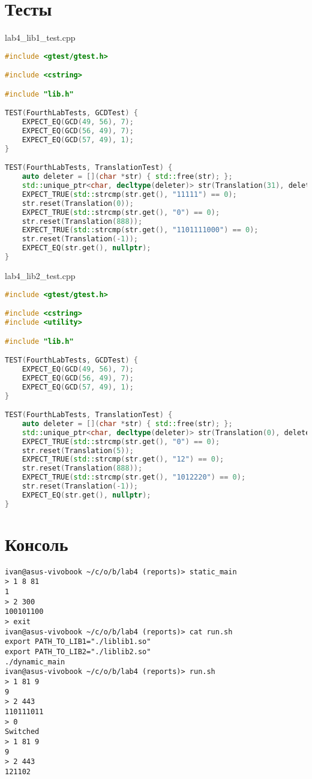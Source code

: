 \documentclass[a4paper, 12pt]{article}
\begin{document}
\newpage
\section{Тесты}
lab4\_lib1\_test.cpp
\begin{lstlisting}[language=C++]
#include <gtest/gtest.h>

#include <cstring>

#include "lib.h"

TEST(FourthLabTests, GCDTest) {
    EXPECT_EQ(GCD(49, 56), 7);
    EXPECT_EQ(GCD(56, 49), 7);
    EXPECT_EQ(GCD(57, 49), 1);
}

TEST(FourthLabTests, TranslationTest) {
    auto deleter = [](char *str) { std::free(str); };
    std::unique_ptr<char, decltype(deleter)> str(Translation(31), deleter);
    EXPECT_TRUE(std::strcmp(str.get(), "11111") == 0);
    str.reset(Translation(0));
    EXPECT_TRUE(std::strcmp(str.get(), "0") == 0);
    str.reset(Translation(888));
    EXPECT_TRUE(std::strcmp(str.get(), "1101111000") == 0);
    str.reset(Translation(-1));
    EXPECT_EQ(str.get(), nullptr);
}
\end{lstlisting}
lab4\_lib2\_test.cpp
\begin{lstlisting}[language=C++]
#include <gtest/gtest.h>

#include <cstring>
#include <utility>

#include "lib.h"

TEST(FourthLabTests, GCDTest) {
    EXPECT_EQ(GCD(49, 56), 7);
    EXPECT_EQ(GCD(56, 49), 7);
    EXPECT_EQ(GCD(57, 49), 1);
}

TEST(FourthLabTests, TranslationTest) {
    auto deleter = [](char *str) { std::free(str); };
    std::unique_ptr<char, decltype(deleter)> str(Translation(0), deleter);
    EXPECT_TRUE(std::strcmp(str.get(), "0") == 0);
    str.reset(Translation(5));
    EXPECT_TRUE(std::strcmp(str.get(), "12") == 0);
    str.reset(Translation(888));
    EXPECT_TRUE(std::strcmp(str.get(), "1012220") == 0);
    str.reset(Translation(-1));
    EXPECT_EQ(str.get(), nullptr);
}
\end{lstlisting}
\newpage

\section{Консоль}
\begin{verbatim}
ivan@asus-vivobook ~/c/o/b/lab4 (reports)> static_main
> 1 8 81
1
> 2 300
100101100
> exit
ivan@asus-vivobook ~/c/o/b/lab4 (reports)> cat run.sh
export PATH_TO_LIB1="./liblib1.so"
export PATH_TO_LIB2="./liblib2.so"
./dynamic_main
ivan@asus-vivobook ~/c/o/b/lab4 (reports)> run.sh
> 1 81 9
9
> 2 443
110111011
> 0
Switched
> 1 81 9
9
> 2 443
121102
\end{verbatim}
\end{document}
